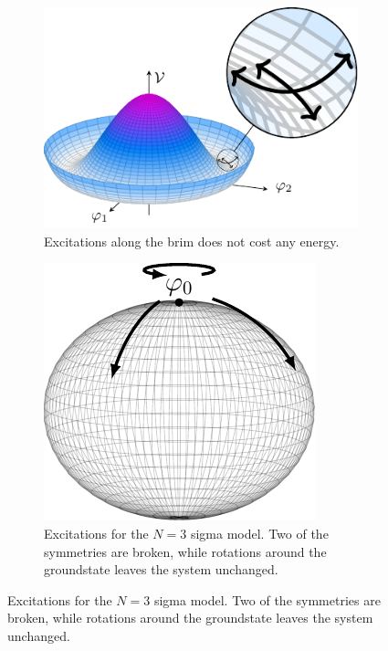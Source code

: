 \begin{figure}[ht]
    \centering
    \begin{subfigure}{0.54\textwidth}
        \centering
        \includegraphics[]{figurer/mexican_hat_zoom.pdf}
        \caption{Excitations along the brim does not cost any energy.}
        \label{fig:Mexican hat zoom}
    \end{subfigure}
    \begin{subfigure}{0.45\textwidth}
        \centering
        \includegraphics[]{figurer/sigma_ground_state.pdf}
        \caption{Excitations for the $N=3$ sigma model. Two of the symmetries are broken, while rotations around the groundstate leaves the system unchanged.}
        \label{fig:ground state manifold}
    \end{subfigure}
\end{figure}

